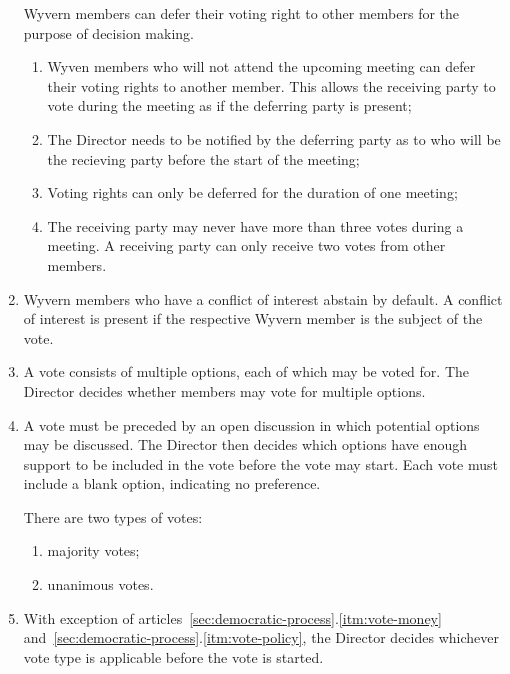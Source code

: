 \begin{enumerate}
    \begin{item}
    	Wyvern members can defer their voting right to other members for the purpose of decision making.
    	\begin{enumerate}
    		\item Wyven members who will not attend the upcoming meeting can defer their voting rights to another member. This allows the receiving party to vote during the meeting as if the deferring party is present;
    		\item The Director needs to be notified by the deferring party as to who will be the recieving party before the start of the meeting;
    		\item Voting rights can only be deferred for the duration of one meeting;
    		\item The receiving party may never have more than three votes during a meeting. A receiving party can only receive two votes from other members.
    	\end{enumerate}
    \end{item}

    \item Wyvern members who have a conflict of interest abstain by default. A conflict of interest is present if the respective Wyvern member is the subject of the vote.

    \item A vote consists of multiple options, each of which may be voted for. The Director decides whether members may vote for multiple options.
    
    \item A vote must be preceded by an open discussion in which potential options may be discussed. The Director then decides which options have enough support to be included in the vote before the vote may start. Each vote must include a blank option, indicating no preference.

    \begin{item}
        There are two types of votes:
        \begin{enumerate}
            \item majority votes;
            \item unanimous votes.
        \end{enumerate}
    \end{item}

    \item With exception of articles~\ref{sec:democratic-process}.\ref{itm:vote-money} and~\ref{sec:democratic-process}.\ref{itm:vote-policy}, the Director decides whichever vote type is applicable before the vote is started.


\end{enumerate}
